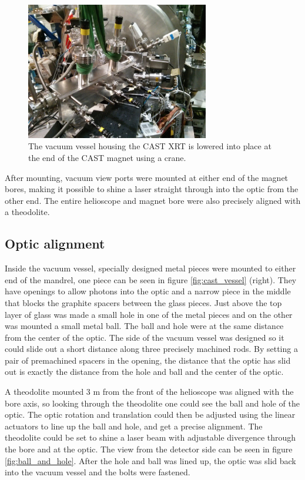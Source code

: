 \begin{figure}[htbp]
  \centering
    \includegraphics[height=6cm]{figures/cast/castxrt_install.jpg}
  \caption{\footnotesize The vacuum vessel housing the CAST XRT is lowered into place at the end of the CAST magnet using a crane.}
  \label{fig:cast_install}
\end{figure}

After mounting, vacuum view ports were mounted at either end of the magnet bores, making it possible to shine a laser straight through into the optic from the other end. The entire helioscope and magnet bore were also precisely aligned with a theodolite.

\subsection{Optic alignment}\label{sec:optic_alignment}
Inside the vacuum vessel, specially designed metal pieces were mounted to either end of the mandrel, one piece can be seen in figure \ref{fig:cast_vessel} (right). They have openings to allow photons into the optic and a narrow piece in the middle that blocks the graphite spacers between the glass pieces. Just above the top layer of glass was made a small hole in one of the metal pieces and on the other was mounted a small metal ball. The ball and hole were at the same distance from the center of the optic. The side of the vacuum vessel was designed so it could slide out a short distance along three precisely machined rods. By setting a pair of premachined spacers in the opening, the distance that the optic has slid out is exactly the distance from the hole and ball and the center of the optic.

A theodolite mounted 3 m from the front of the helioscope was aligned with the bore axis, so looking through the theodolite one could see the ball and hole of the optic. The optic rotation and translation could then be adjusted using the linear actuators to line up the ball and hole, and get a precise alignment. The theodolite could be set to shine a laser beam with adjustable divergence through the bore and at the optic. The view from the detector side can be seen in figure \ref{fig:ball_and_hole}. After the hole and ball was lined up, the optic was slid back into the vacuum vessel and the bolts were fastened.

